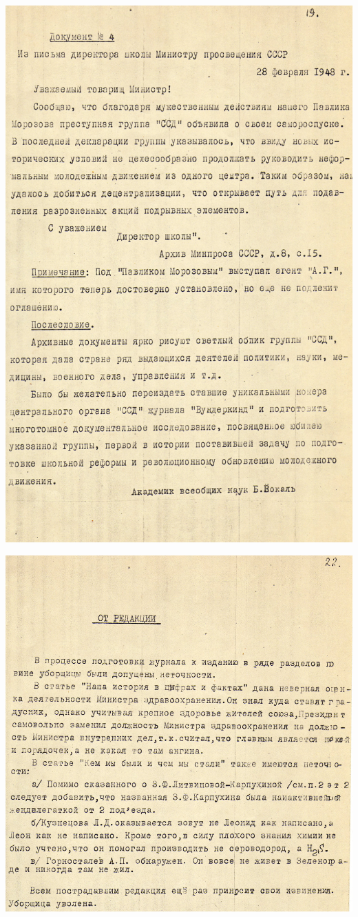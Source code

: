 \noindent
\includegraphics[width=\textwidth]{inc/Vynd/Vynd026}

\noindent
\includegraphics[width=\textwidth]{inc/Vynd/Vynd027}

